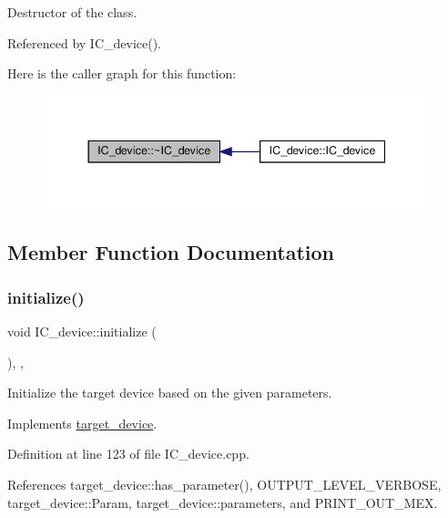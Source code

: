 Destructor of the class. 



Referenced by I\+C\+\_\+device().

Here is the caller graph for this function\+:
\nopagebreak
\begin{figure}[H]
\begin{center}
\leavevmode
\includegraphics[width=344pt]{dc/d61/classIC__device_a8593f39ee1f3004c2b512ba8ad68655d_icgraph}
\end{center}
\end{figure}


\subsection{Member Function Documentation}
\mbox{\label{classIC__device_a7f816b4ac2c63f1384bbbcea096505a8}} 
\subsubsection{\texorpdfstring{initialize()}{initialize()}}
{\footnotesize\ttfamily void I\+C\+\_\+device\+::initialize (\begin{DoxyParamCaption}{ }\end{DoxyParamCaption})\hspace{0.3cm}{\ttfamily [override]}, {\ttfamily [protected]}, {\ttfamily [virtual]}}



Initialize the target device based on the given parameters. 



Implements \hyperlink{classtarget__device_a8036fcb32879f6d3acd5b3f71a457a3e}{target\+\_\+device}.



Definition at line 123 of file I\+C\+\_\+device.\+cpp.



References target\+\_\+device\+::has\+\_\+parameter(), O\+U\+T\+P\+U\+T\+\_\+\+L\+E\+V\+E\+L\+\_\+\+V\+E\+R\+B\+O\+SE, target\+\_\+device\+::\+Param, target\+\_\+device\+::parameters, and P\+R\+I\+N\+T\+\_\+\+O\+U\+T\+\_\+\+M\+EX.



